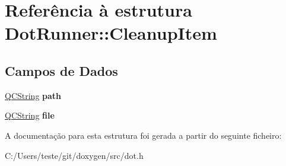 \hypertarget{struct_dot_runner_1_1_cleanup_item}{\section{Referência à estrutura Dot\-Runner\-:\-:Cleanup\-Item}
\label{struct_dot_runner_1_1_cleanup_item}
}
\subsection*{Campos de Dados}
\begin{DoxyCompactItemize}
\item 
\hypertarget{struct_dot_runner_1_1_cleanup_item_a71216f035ef8cbf975e0712d46e89e9b}{\hyperlink{class_q_c_string}{Q\-C\-String} {\bfseries path}}\label{struct_dot_runner_1_1_cleanup_item_a71216f035ef8cbf975e0712d46e89e9b}

\item 
\hypertarget{struct_dot_runner_1_1_cleanup_item_afeb3e9dc965e44d291bbce99ea8dbcc7}{\hyperlink{class_q_c_string}{Q\-C\-String} {\bfseries file}}\label{struct_dot_runner_1_1_cleanup_item_afeb3e9dc965e44d291bbce99ea8dbcc7}

\end{DoxyCompactItemize}


A documentação para esta estrutura foi gerada a partir do seguinte ficheiro\-:\begin{DoxyCompactItemize}
\item 
C\-:/\-Users/teste/git/doxygen/src/dot.\-h\end{DoxyCompactItemize}
